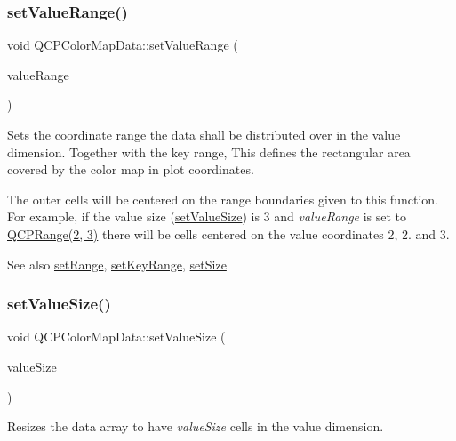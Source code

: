 \subsubsection{\texorpdfstring{set\+Value\+Range()}{setValueRange()}}
{\footnotesize\ttfamily void Q\+C\+P\+Color\+Map\+Data\+::set\+Value\+Range (\begin{DoxyParamCaption}\item[{const \hyperlink{class_q_c_p_range}{Q\+C\+P\+Range} \&}]{value\+Range }\end{DoxyParamCaption})}

Sets the coordinate range the data shall be distributed over in the value dimension. Together with the key range, This defines the rectangular area covered by the color map in plot coordinates.

The outer cells will be centered on the range boundaries given to this function. For example, if the value size (\hyperlink{class_q_c_p_color_map_data_a0893c9e3914513048b45e3429ffd16f2}{set\+Value\+Size}) is 3 and {\itshape value\+Range} is set to {\ttfamily \hyperlink{class_q_c_p_range}{Q\+C\+P\+Range(2, 3)}} there will be cells centered on the value coordinates 2, 2. and 3.

\begin{DoxySeeAlso}{See also}
\hyperlink{class_q_c_p_color_map_data_aad9c1c7c703c1339489fc730517c83d4}{set\+Range}, \hyperlink{class_q_c_p_color_map_data_a0738c485f3c9df9ea1241b7a8bb6a86e}{set\+Key\+Range}, \hyperlink{class_q_c_p_color_map_data_a0d9ff35c299d0478b682bfbcdd9c097e}{set\+Size} 
\end{DoxySeeAlso}
\mbox{\label{class_q_c_p_color_map_data_a0893c9e3914513048b45e3429ffd16f2}} 
\subsubsection{\texorpdfstring{set\+Value\+Size()}{setValueSize()}}
{\footnotesize\ttfamily void Q\+C\+P\+Color\+Map\+Data\+::set\+Value\+Size (\begin{DoxyParamCaption}\item[{int}]{value\+Size }\end{DoxyParamCaption})}

Resizes the data array to have {\itshape value\+Size} cells in the value dimension.

